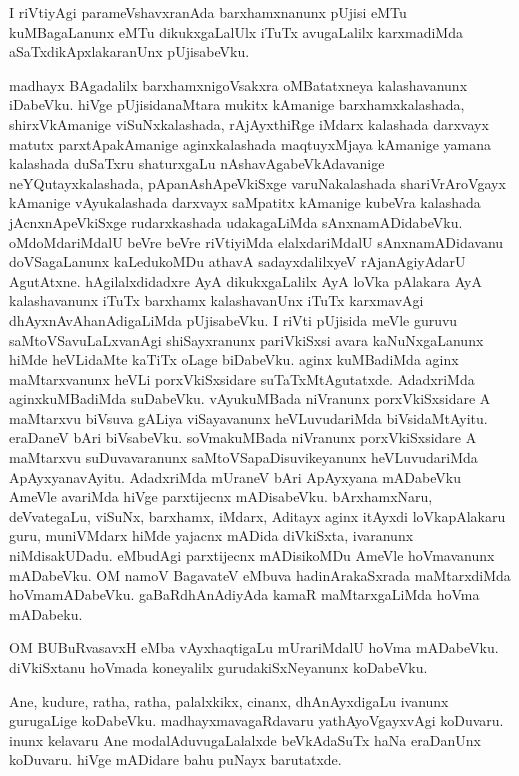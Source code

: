 \begin{mng}
I riVtiyAgi parameVshavxranAda barxhamxnanunx pUjisi eMTu kuMBagaLanunx eMTu dikukxgaLalUlx iTuTx avugaLalilx karxmadiMda aSaTxdikApxlakaranUnx pUjisabeVku.
\end{mng}

\begin{mng}
madhayx BAgadalilx barxhamxnigoVsakxra oMBatatxneya kalashavanunx iDabeVku. hiVge pUjisidanaMtara mukitx kAmanige barxhamxkalashada, shirxVkAmanige viSuNxkalashada, rAjAyxthiRge iMdarx kalashada darxvayx matutx parxtApakAmanige aginxkalashada maqtuyxMjaya kAmanige yamana kalashada duSaTxru shaturxgaLu nAshavAgabeVkAdavanige neYQutayxkalashada, pApanAshApeVkiSxge varuNakalashada shariVrAroVgayx kAmanige vAyukalashada darxvayx saMpatitx kAmanige kubeVra kalashada jAcnxnApeVkiSxge rudarxkashada udakagaLiMda sAnxnamADidabeVku. oMdoMdariMdalU beVre beVre riVtiyiMda elalxdariMdalU sAnxnamADidavanu doVSagaLanunx kaLedukoMDu athavA sadayxdalilxyeV rAjanAgiyAdarU AgutAtxne. hAgilalxdidadxre AyA dikukxgaLalilx AyA loVka pAlakara AyA kalashavanunx iTuTx barxhamx kalashavanUnx iTuTx karxmavAgi dhAyxnAvAhanAdigaLiMda pUjisabeVku. I riVti pUjisida meVle guruvu saMtoVSavuLaLxvanAgi shiSayxranunx pariVkiSxsi avara kaNuNxgaLanunx hiMde heVLidaMte kaTiTx oLage biDabeVku. aginx kuMBadiMda aginx maMtarxvanunx heVLi porxVkiSxsidare suTaTxMtAgutatxde. AdadxriMda aginxkuMBadiMda suDabeVku. vAyukuMBada niVranunx porxVkiSxsidare A maMtarxvu biVsuva gALiya viSayavanunx heVLuvudariMda biVsidaMtAyitu. eraDaneV bAri biVsabeVku. soVmakuMBada niVranunx porxVkiSxsidare A maMtarxvu suDuvavaranunx saMtoVSapaDisuvikeyanunx heVLuvudariMda ApAyxyanavAyitu. AdadxriMda mUraneV bAri ApAyxyana mADabeVku AmeVle avariMda hiVge parxtijecnx mADisabeVku. bArxhamxNaru, deVvategaLu, viSuNx, barxhamx, iMdarx, Aditayx aginx itAyxdi loVkapAlakaru guru, muniVMdarx hiMde yajacnx mADida diVkiSxta, ivaranunx niMdisakUDadu. eMbudAgi parxtijecnx mADisikoMDu AmeVle hoVmavanunx mADabeVku. OM namoV BagavateV eMbuva hadinArakaSxrada maMtarxdiMda hoVmamADabeVku. gaBaRdhAnAdiyAda kamaR maMtarxgaLiMda hoVma mADabeku.
\end{mng}

\begin{mng}
OM BUBuRvasavxH eMba vAyxhaqtigaLu mUrariMdalU hoVma mADabeVku. diVkiSxtanu hoVmada koneyalilx gurudakiSxNeyanunx koDabeVku.
\end{mng}

\begin{mng}
Ane, kudure, ratha, ratha, palalxkikx, cinanx, dhAnAyxdigaLu ivanunx gurugaLige koDabeVku. madhayxmavagaRdavaru yathAyoVgayxvAgi koDuvaru. inunx kelavaru Ane modalAduvugaLalalxde beVkAdaSuTx haNa eraDanUnx koDuvaru. hiVge mADidare bahu puNayx barutatxde.
\end{mng}

